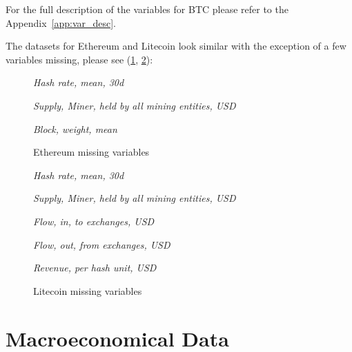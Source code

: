 For the full description of the variables for \ac{BTC} please refer to the Appendix~\ref{app:var_desc}.


The datasets for Ethereum and Litecoin look similar with the exception of a few variables missing,
please see (\ref{ethereum:missing}, \ref{litecoin:missing}):

\begin{figure}[!htbp]
    \begin{center}
    \caption{Ethereum missing variables}\label{ethereum:missing}
    \begin{boxeditemize}
        \item \textit{Hash rate, mean, 30d}
        \item \textit{Supply, Miner, held by all mining entities, USD}
        \item \textit{Block, weight, mean}
    \end{boxeditemize}
    \end{center}
    \end{figure}

    \begin{figure}[!htbp]
        \begin{center}
        \caption{Litecoin missing variables}\label{litecoin:missing}
        \begin{boxeditemize}
            \item \textit{Hash rate, mean, 30d}
            \item \textit{Supply, Miner, held by all mining entities, USD}
            \item \textit{Flow, in, to exchanges, USD}
            \item \textit{Flow, out, from exchanges, USD}
            \item \textit{Revenue, per hash unit, USD}
        \end{boxeditemize}
        \end{center}
        \end{figure}


\section{Macroeconomical Data}

